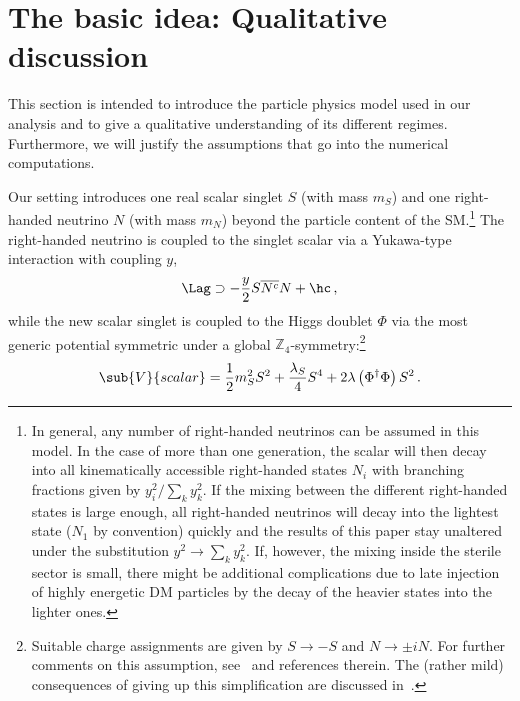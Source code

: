 \section{\label{sec:QualitativeDiscussion}The basic idea: Qualitative discussion}

This section is intended to introduce the particle physics model used in our analysis and to give a qualitative understanding of its different regimes. Furthermore, we will justify the assumptions that go into the numerical computations.

Our setting introduces one real scalar singlet $S$ (with mass $m_S$) and one right-handed neutrino $N$ (with mass $m_N$) beyond the particle content of the SM.\footnote{In general, any number of right-handed neutrinos can be assumed in this model. In the case of more than one generation, the scalar will then decay into all kinematically accessible right-handed states $N_i$ with branching fractions given by $y_i^2/\sum_k y_k^2$. If the mixing between the different right-handed states is large enough, all right-handed neutrinos will decay into the lightest state ($N_1$ by convention) quickly and the results of this paper stay unaltered under the substitution $y^2 \rightarrow \sum_k y_k^2$. If, however, the mixing inside the sterile sector is small, there might be additional complications due to late injection of highly energetic DM particles by the decay of the heavier states into the lighter ones.} The right-handed neutrino is coupled to the singlet scalar via a Yukawa-type interaction with coupling $y$,
\begin{align}
 \Lag \supset - \frac{y}{2} S \overline{N^c}N + \hc \,,
 \label{eq:YukawaCouplingLagrangia}
\end{align}
while the new scalar singlet is coupled to the Higgs doublet $\Phi$ via the most generic potential symmetric under a global $\mathbb{Z}_4$-symmetry:\footnote{Suitable charge assignments are given by $S \to -S$ and $N\to \pm i N$. For further comments on this assumption, see~\cite{Merle:2013wta,Merle:2015oja} and references therein. The (rather mild) consequences of giving up this simplification are discussed in~\cite{Petraki:2007gq}.}
\begin{align}
  \sub{V}{scalar} =   \frac{1}{2} m_S^2 S^2 + \frac{\lambda_S}{4} S^4 +2\lambda \left(\Phi^\dagger \Phi\right)S^2 \,.
 \label{eq:ScalarPotentialLagrangian}
\end{align}
